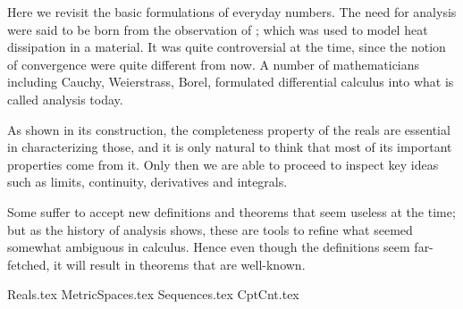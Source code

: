  \label{chap:PMA}

Here we revisit the basic formulations of everyday numbers.
The need for analysis were said to be born
from the observation of ;
which was used to model heat dissipation in a material.
It was quite controversial at the time,
since the notion of convergence were quite different from now.
A number of mathematicians including
Cauchy,
Weierstrass,
Borel,
formulated differential calculus into what is called analysis today.

As shown in its construction,
the completeness property of the reals are essential
in characterizing those,
and it is only natural to think that
most of its important properties come from it.
Only then we are able to proceed to inspect key ideas such as
limits,
continuity,
derivatives and integrals.

Some suffer to accept new definitions and theorems
that seem useless at the time;
but as the history of analysis shows,
these are tools to refine what seemed somewhat ambiguous in calculus.
Hence even though the definitions seem far-fetched,
it will result in theorems that are well-known.

{Reals.tex}
{MetricSpaces.tex}
{Sequences.tex}
{CptCnt.tex}